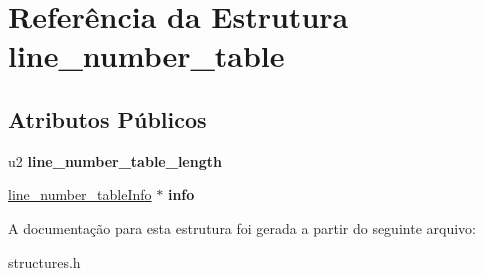 \hypertarget{structline__number__table}{}\section{Referência da Estrutura line\+\_\+number\+\_\+table}
\label{structline__number__table}
\subsection*{Atributos Públicos}
\begin{DoxyCompactItemize}
\item 
\mbox{\label{structline__number__table_abe258fd7b751d3d72da9b207afd11beb}} 
u2 {\bfseries line\+\_\+number\+\_\+table\+\_\+length}
\item 
\mbox{\label{structline__number__table_a1d2c6e92d6243f7753d153cc11313ad9}} 
\hyperlink{structline__number__tableInfo}{line\+\_\+number\+\_\+table\+Info} $\ast$ {\bfseries info}
\end{DoxyCompactItemize}


A documentação para esta estrutura foi gerada a partir do seguinte arquivo\+:\begin{DoxyCompactItemize}
\item 
structures.\+h\end{DoxyCompactItemize}
